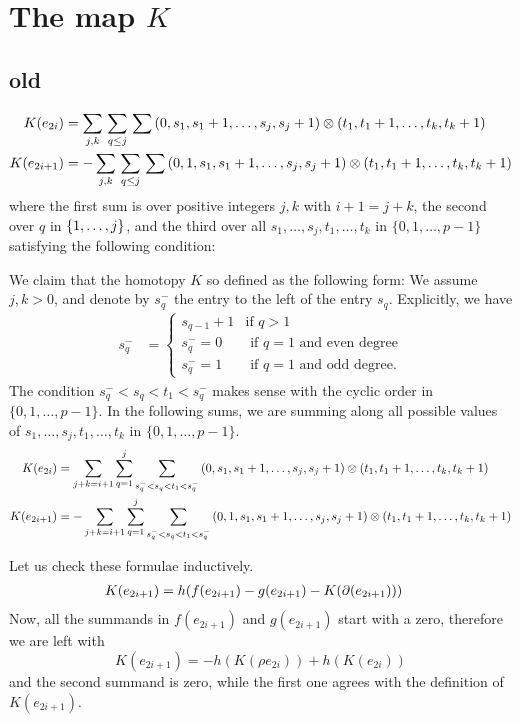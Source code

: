 
\appendix
\section{The map $K$}\label{s:closed formula}

\subsection*{old}

\begin{align*}
	K(e_{2i}) &= \sum_{j,k} \, \sum_{q \leq j} \, \sum \,
	(0,s_1,s_1+1,\dots,s_j,s_j+1) \otimes (t_1,t_1+1,\dots,t_k,t_k+1) \\
	K(e_{2i+1}) &= - \sum_{j,k} \, \sum_{q \leq j} \, \sum \,
	(0,1,s_1,s_1+1,\dots,s_j,s_j+1) \otimes (t_1,t_1+1,\dots,t_k,t_k+1)
\end{align*}
where the first sum is over positive integers $j,k$ with $i+1 = j+k$, the second over $q$ in $\{1,\dots,j\}$, and the third over all $s_1,\dots,s_j, t_1,\dots,t_k$ in $\{0,1,\dots,p-1\}$ satisfying the following condition:

We claim that the homotopy $K$ so defined as the following form: We assume $j,k>0$, and denote by $s_q^-$ the entry to the left of the entry $s_q$.
Explicitly, we have
\begin{align*}
	s_q^- &= \begin{cases}s_{q-1}+1 & \text{if $q>1$}\\
		s_q^- = 0 & \text{ if $q=1$ and even degree} \\
		s_q^- = 1 &\text{ if $q=1$ and odd degree.}
	\end{cases}
\end{align*}
The condition $s_q^-<s_q<t_1<s_q^-$ makes sense with the cyclic order in $\{0,1,\dots,p-1\}$.
In the following sums, we are summing along all possible values of $s_1,\dots,s_j,t_1,\dots,t_k$ in $\{0,1,\dots,p-1\}$.
\begin{align*}
	K(e_{2i}) &= \sum_{j+k = i+1}{\sum_{q=1}^j{\sum_{s_q^-<s_q<t_1<s_q^-}{(0,s_1,s_1+1,\dots,s_j,s_j+1)\otimes(t_1,t_1+1,\dots,t_k,t_k+1)}}} \\
	K(e_{2i+1}) &= -\sum_{j+k = i+1}{\sum_{q=1}^j{\sum_{s_q^-<s_q<t_1<s_q^-}{(0,1,s_1,s_1+1,\dots,s_j,s_j+1)\otimes(t_1,t_1+1,\dots,t_k,t_k+1)}}}
\end{align*}

Let us check these formulae inductively.
\begin{align*}
	K(e_{2i+1}) &= h(f(e_{2i+1})-g(e_{2i+1})-K(\operatorname{\partial}(e_{2i+1})))
\end{align*}
Now, all the summands in $f(e_{2i+1})$ and $g(e_{2i+1})$ start with a zero, therefore we are left with
\[K(e_{2i+1}) = -h(K(\rho e_{2i}))+h(K(e_{2i}))\]
and the second summand is zero, while the first one agrees with the definition of $K(e_{2i+1})$.

